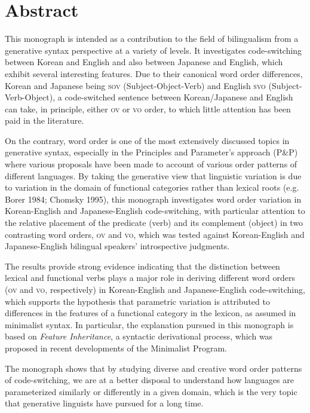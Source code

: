 \chapter*{Abstract}

This monograph is intended as a contribution to the field of bilingualism from a generative syntax perspective at a variety of levels. It investigates code-switching between Korean and English and also between Japanese and English, which exhibit several interesting features. Due to their canonical word order differences, Korean and Japanese being \textsc{sov} (Subject-Object-Verb) and English \textsc{svo} (Subject-Verb-Object), a code-switched sentence between Korean/Japanese and English can take, in principle, either \textsc{ov} or \textsc{vo} order, to which little attention has been paid in the literature. 

On the contrary, word order is one of the most extensively discussed topics in generative syntax, especially in the Principles and Parameter’s approach (P\&P) where various proposals have been made to account of various order patterns of different languages. By taking the generative view that linguistic variation is due to variation in the domain of functional categories rather than lexical roots (e.g. Borer 1984; Chomsky 1995), this monograph investigates word order variation in Korean-English and Japanese-English code-switching, with particular attention to the relative placement of the predicate (verb) and its complement (object) in two contrasting word orders, \textsc{ov} and \textsc{vo}, which was tested against Korean-English and Japanese-English bilingual speakers’ introspective judgments. 
	
The results provide strong evidence indicating that the distinction between lexical and functional verbs plays a major role in deriving different word orders (\textsc{ov} and \textsc{vo}, respectively) in Korean-English and Japanese-English code-switching, which supports the hypothesis that parametric variation is attributed to differences in the features of a functional category in the lexicon, as assumed in minimalist syntax. In particular, the explanation pursued in this monograph is based on \textit{Feature Inheritance}, a syntactic derivational process, which was proposed in recent developments of the Minimalist Program. 

The monograph shows that by studying diverse and creative word order patterns of code-switching, we are at a better disposal to understand how languages are parameterized similarly or differently in a given domain, which is the very topic that generative linguists have pursued for a long time.